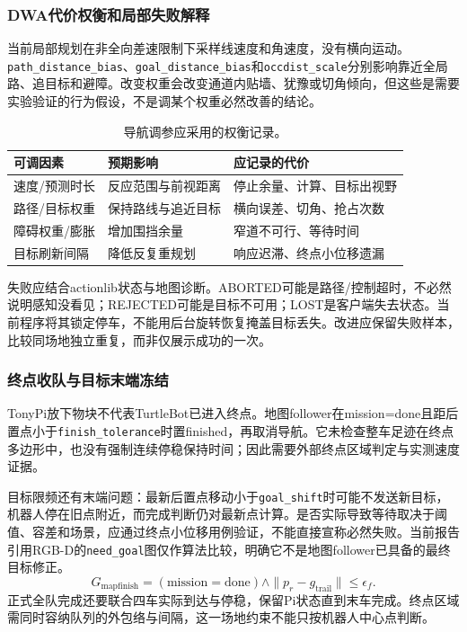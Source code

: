 \subsubsection{DWA代价权衡和局部失败解释}
当前局部规划在非全向差速限制下采样线速度和角速度，没有横向运动。\texttt{path\_\allowbreak distance\_\allowbreak bias}、\texttt{goal\_\allowbreak distance\_\allowbreak bias}和\texttt{occdist\_\allowbreak scale}分别影响靠近全局路、追目标和避障。改变权重会改变通道内贴墙、犹豫或切角倾向，但这些是需要实验验证的行为假设，不是调某个权重必然改善的结论。
\begin{table}[H]\centering\small\begin{tabularx}{\linewidth}{p{33mm}YY}\toprule 可调因素 & 预期影响 & 应记录的代价\\\midrule
速度/预测时长 & 反应范围与前视距离 & 停止余量、计算、目标出视野\\
路径/目标权重 & 保持路线与追近目标 & 横向误差、切角、抢占次数\\
障碍权重/膨胀 & 增加围挡余量 & 窄道不可行、等待时间\\
目标刷新间隔 & 降低反复重规划 & 响应迟滞、终点小位移遗漏\\\bottomrule\end{tabularx}\caption{导航调参应采用的权衡记录。}\end{table}
失败应结合actionlib状态与地图诊断。ABORTED可能是路径/控制超时，不必然说明感知没看见；REJECTED可能是目标不可用；LOST是客户端失去状态。当前程序将其锁定停车，不能用后台旋转恢复掩盖目标丢失。改进应保留失败样本，比较同场地独立重复，而非仅展示成功的一次。

\subsubsection{终点收队与目标末端冻结}
TonyPi放下物块不代表TurtleBot已进入终点。地图follower在mission=done且距后置点小于\texttt{finish\_\allowbreak tolerance}时置finished，再取消导航。它未检查整车足迹在终点多边形中，也没有强制连续停稳保持时间；因此需要外部终点区域判定与实测速度证据。

目标限频还有末端问题：最新后置点移动小于\texttt{goal\_\allowbreak shift}时可能不发送新目标，机器人停在旧点附近，而完成判断仍对最新点计算。是否实际导致等待取决于阈值、容差和场景，应通过终点小位移用例验证，不能直接宣称必然失败。当前报告引用RGB-D的\texttt{need\_\allowbreak goal}图仅作算法比较，明确它不是地图follower已具备的最终目标修正。
\begin{equation}
G_{\mathrm{mapfinish}}=(\mathrm{mission}=\mathrm{done})\land\|p_r-g_{\mathrm{trail}}\|\le\epsilon_f.
\end{equation}
正式全队完成还要联合四车实际到达与停稳，保留Pi状态直到末车完成。终点区域需同时容纳队列的外包络与间隔，这一场地约束不能只按机器人中心点判断。

